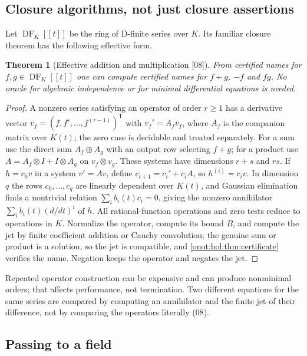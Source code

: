 \documentclass[11pt,oneside]{article}
\numberwithin{equation}{section}
\newtheorem{theorem}{Theorem}[section]
\theoremstyle{definition}
\theoremstyle{remark}
\newcommand{\DF}{\operatorname{DF}}
\newcommand{\src}[1]{\textup{\textsf{\small[#1]}}}
\begin{document}
\subsection{Closure algorithms, not just closure assertions}

Let $\DF_K[[t]]$ be the ring of D-finite series over $K$. Its familiar closure
theorem \cite{Stanley} has the following effective form.

\begin{theorem}[Effective addition and multiplication \src{08}]\label{onot:hol:thm:dfclosure}
From certified names for $f,g\in\DF_K[[t]]$ one can compute certified names for
$f+g$, $-f$ and $fg$. No oracle for algebraic independence or for minimal
differential equations is needed.
\end{theorem}
\begin{proof}
A nonzero series satisfying an operator of order $r\ge1$ has a derivative vector
$v_f=(f,f',\ldots,f^{(r-1)})^{\mathsf T}$ with $v_f'=A_fv_f$, where $A_f$ is the
companion matrix over $K(t)$; the zero case is decidable and treated separately.
For a sum use the direct sum $A_f\oplus A_g$ with an output row selecting $f+g$;
for a product use $A=A_f\otimes I+I\otimes A_g$ on $v_f\otimes v_g$. These
systems have dimensions $r+s$ and $rs$. If $h=c_0v$ in a system $v'=Av$, define
$c_{i+1}=c_i'+c_iA$, so $h^{(i)}=c_iv$. In dimension $q$ the rows
$c_0,\ldots,c_q$ are linearly dependent over $K(t)$, and Gaussian elimination
finds a nontrivial relation $\sum_ib_i(t)c_i=0$, giving the nonzero annihilator
$\sum_ib_i(t)(d/dt)^i$ of $h$. All rational-function operations and zero tests
reduce to operations in $K$. Normalize the operator, compute its bound $B$, and
compute the jet by finite coefficient addition or Cauchy convolution; the genuine
sum or product is a solution, so the jet is compatible, and
\cref{onot:hol:thm:certificate} verifies the name. Negation keeps the operator
and negates the jet.
\end{proof}

Repeated operator construction can be expensive and can produce nonminimal
orders; that affects performance, not termination. Two different equations for
the same series are compared by computing an annihilator and the finite jet of
their difference, not by comparing the operators literally (08).

\subsection{Passing to a field}
\end{document}
